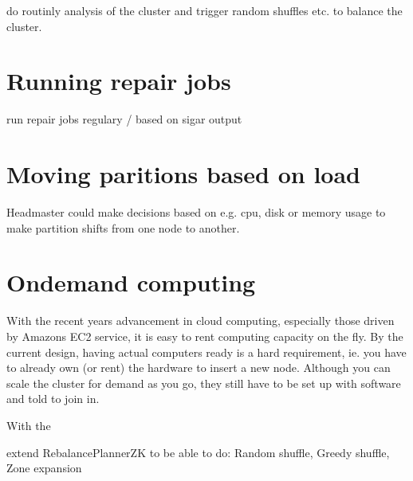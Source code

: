 do routinly analysis of the cluster and trigger random shuffles etc. to balance the cluster.

\section{Running repair jobs}
run repair jobs regulary / based on sigar output

\section{Moving paritions based on load}
Headmaster could make decisions based on e.g. cpu, disk or memory usage to make partition shifts from one node to another.

\section{Ondemand computing}
With the recent years advancement in cloud computing, especially those driven by Amazons EC2 service, it is easy to rent computing capacity on the fly. By the current design, having actual computers ready is a hard requirement, ie. you have to already own (or rent) the hardware to insert a new node. Although you can scale the cluster for demand as you go, they still have to be set up with software and told to join in.

With the 

extend RebalancePlannerZK to be able to do: Random shuffle, Greedy shuffle, Zone expansion
